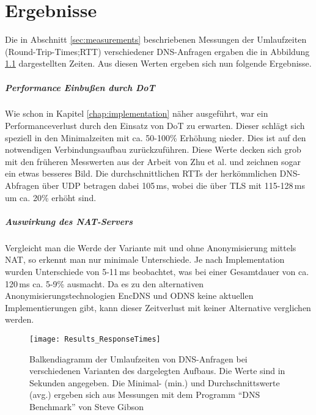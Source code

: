 \chapter{Ergebnisse}
\label{chap:results}

Die in Abschnitt \ref{sec:measurements} beschriebenen Messungen der Umlaufzeiten (Round-Trip-Times;RTT) verschiedener DNS-Anfragen ergaben die in Abbildung \ref{img:results-times} dargestellten Zeiten. Aus diesen Werten ergeben sich nun folgende Ergebnisse.

\paragraph{Performance Einbußen durch DoT}
Wie schon in Kapitel \ref{chap:implementation} näher ausgeführt, war ein Performanceverlust durch den Einsatz von DoT zu erwarten. Dieser schlägt sich speziell in den Minimalzeiten mit ca. 50-100\% Erhöhung nieder. Dies ist auf den notwendigen Verbindungsaufbau zurückzuführen. Diese Werte decken sich grob mit den früheren Messwerten aus der Arbeit von Zhu et al.\cite{Zhu2015} und zeichnen sogar ein etwas besseres Bild. Die durchschnittlichen RTTs der herkömmlichen DNS-Abfragen über UDP betragen dabei 105\,ms, wobei die über TLS mit 115-128\,ms um ca. 20\% erhöht sind.

\paragraph{Auswirkung des NAT-Servers}
Vergleicht man die Werde der Variante mit und ohne Anonymisierung mittels NAT, so erkennt man nur minimale Unterschiede. Je nach Implementation wurden Unterschiede von 5-11\,ms beobachtet, was bei einer Gesamtdauer von ca. 120\,ms ca. 5-9\% ausmacht. Da es zu den alternativen Anonymisierungstechnologien EncDNS und ODNS keine aktuellen Implementierungen gibt, kann dieser Zeitverlust mit keiner Alternative verglichen werden.

\begin{figure}[hb]
    \centering
    \texttt{[image: Results\_ResponseTimes]}
    \caption{Balkendiagramm der Umlaufzeiten von DNS-Anfragen bei verschiedenen Varianten des dargelegten Aufbaus. Die Werte sind in Sekunden angegeben. Die Minimal- (min.) und Durchschnittswerte (avg.) ergeben sich aus Messungen mit dem Programm ``DNS Benchmark'' von Steve Gibson}
    \label{img:results-times}
\end{figure}